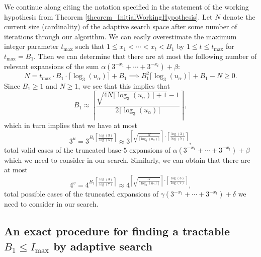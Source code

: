 \documentclass[12pt]{article}
\begin{document}
We continue along citing the notation specified in the statement of the working hypothesis from 
Theorem \ref{theorem_InitialWorkingHypothesis}. 
Let $N$ denote the current size (cardinality) of the adaptive search space after some number of 
iterations through our algorithm. We can easily overestimate the maximum integer parameter 
$t_{\max}$ such that $1 \leq x_1 < \cdots < x_t < B_1$ by $1 \leq t \leq t_{\max}$ for $t_{\max} = B_1$. 
Then we can determine that there are at most the following number of relevant expansions of the sum 
$\alpha(3^{-x_1}+\cdots+3^{-x_t}) + \beta$: 
\[
N = t_{\max} \cdot B_1 \cdot \lceil \log_3(u_{\alpha}) \rceil + B_1 \implies 
     B_1^2 \lceil \log_3(u_{\alpha}) \rceil + B_1 - N \geq 0. 
\]
Since $B_1 \geq 1$ and $N \geq 1$, we see that this implies that 
\[
B_1 \approx \left\lceil \frac{\sqrt{4N \lceil \log_3(u_{\alpha}) \rceil+1}-1}{ 
     2 \lceil \log_3(u_{\alpha}) \rceil}\right\rceil, 
\]
which in turn implies that we have at most 
\[
3^u = 3^{B_1 \left\lceil \frac{\log(3)}{\log(5)} \right\rceil} \approx 
     3^{\left\lceil \sqrt{\frac{N}{\lceil \log_3(u_{\alpha}) \rceil}} \right\rceil 
     \cdot \left\lceil \frac{\log(3)}{\log(5)} \right\rceil}, 
\]
total valid cases of the truncated base-$5$ expansions of $\alpha(3^{-x_1}+\cdots+3^{-x_t}) + \beta$ 
which we need to consider in our search. 
Similarly, we can obtain that there are at most 
\[
4^v = 4^{B_1 \left\lceil \frac{\log(3)}{\log(7)} \right\rceil} \approx 
     4^{\left\lceil \sqrt{\frac{N}{\lceil \log_3(u_{\gamma}) \rceil}} \right\rceil 
     \cdot \left\lceil \frac{\log(3)}{\log(7)} \right\rceil}, 
\] 
total possible cases of the truncated expansions of 
$\gamma(3^{-x_1}+\cdots+3^{-x_t}) + \delta$ we need to consider in our search. 

\subsection{An exact procedure for finding a tractable $B_1 \leq I_{\max}$ by adaptive search} 
\label{SubSection_ArgConvOfB1} 
\end{document}
